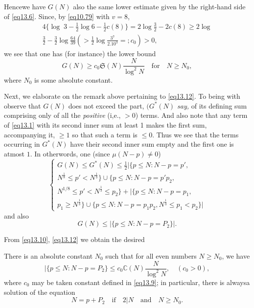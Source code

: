 Hence\pageoriginale we have $G(N)$ also the same lower estimate given by the
right-hand side of \eqref{eq13.6}. Since, by \eqref{eq10.79} with $v=8$, 
\begin{gather*}
4 \bigg\{ \log \; 3- \frac{1}{2} \log  6-\frac{1}{2} c(8) \bigg\}=2
\log  \frac{3}{2}- 2c (8) \ge 2 \log\\
 \frac{3}{2}- \frac{3}{2} \log
\frac{64}{39} (> \frac{1}{2} \log \frac{3^7}{2.10^3}=;
c_0)>0,\tag{13.9}\label{eq13.9} 
\end{gather*}
we see that one has (for instance) the lower bound
\begin{equation*}
G(N) \ge  c_0 \mathfrak{S} (N) \frac{N}{\log^2 N} \quad\text{for}\quad N \ge
N_0,\tag{13.10}\label{eq13.10} 
\end{equation*}
where $N_0$ is some absolute constant.

Next, we elaborate on the remark above pertaining to \eqref{eq13.12}. To
being with observe that $G(N)$ does not exceed the part,
\textit{$(G^*(N)$ say,} of its defining sum comprising  only of all
the \textit{positive} (i,e., $> 0$) terms. And also note that any term
of \eqref{eq13.1} with its second inner sum at least 1 makes the first
sum, accompanying it, $\ge 1$ so that such a term is $ \le 0$. Thus
we see that the terms occurring in $G^*(N)$ have their second inner sum
empty and the first one is atmost $1$. In otherwords, one (since $\mu
(N-p)\neq 0$)   
\begin{equation*}
\begin{cases}
G(N)\le G^* (N) \le \frac{1}{2} | \{ p \le N:N-p=p',\\ 
N^{\frac{1}{8}}
\le p' < N^{\frac{1}{3}}\} \cup \{p \le N:N-p= p' p_2,\\
N^{1/8}\le p' <
N^{\frac{1}{3}} \le p_2 \}+ 
| \{ p \le N:N-p=p_1,\\
p_1 \ge N^{\frac{1}{3}}\} \cup \{ p \le N:N-p=
p_1 p_2, N^{\frac{1}{3}} \le  p_1 < p_2\} | 
\end{cases}\tag{13.11}\label{eq13.11}
\end{equation*}
and also
\begin{equation*}
G(N) \le | \{ p \le N: N-p =P_2 \} |.\tag{13.12}\label{eq13.12}
\end{equation*}

From \eqref{eq13.10}, \eqref{eq13.12} we obtain the desired

\setcounter{section}{13}
\setcounter{theorem}{0}
\begin{theorem}\label{chap13-thm13.1}
There is an absolute constant $N_0$ such that for all even numbers $N
\ge N_0$, we have   
\begin{equation*}
|\{ p \le N:N-p=P_2 \} \le c_0  \mathbb{C} (N) \frac{N}{\log^2 N},\quad
(c_0 >0),\tag{13.13}\label{eq13.13} 
\end{equation*}
where $c_0$ may be taken constant defined in \eqref{eq13.9}; in particular,
there is always\pageoriginale a solution of the equation  
$$
N= p+P_2  \quad\text{if}\quad 2|N\quad \text{and}\quad N \ge N_0.
$$
\end{theorem}

